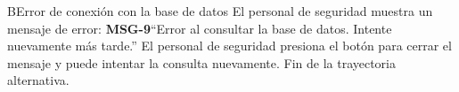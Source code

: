 \begin{UCtrayectoriaA}{B}{Error de conexión con la base de datos}
	\UCpaso[\UCactor] El personal de seguridad muestra un mensaje de error: {\bf MSG-9}{``Error al consultar la base de datos. Intente nuevamente más tarde.''}
	\UCpaso[\UCactor] El personal de seguridad presiona el botón  para cerrar el mensaje y puede intentar la consulta nuevamente.
	\UCpaso Fin de la trayectoria alternativa.
\end{UCtrayectoriaA}

